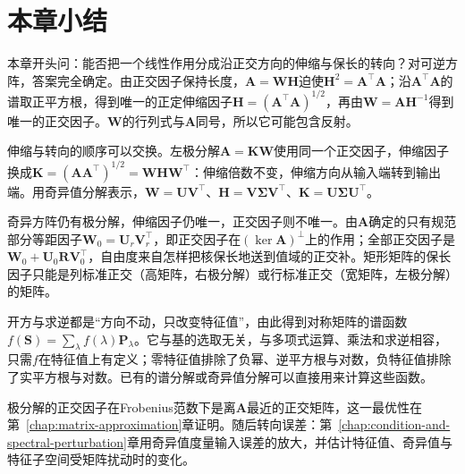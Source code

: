 \FloatBarrier
\section{本章小结}
\label{sec:polar-chapter-summary}

本章开头问：能否把一个线性作用分成沿正交方向的伸缩与保长的转向？对可逆方阵，答案完全确定。由正交因子保持长度，$\bm A=\bm W\bm H$迫使$\bm H^2=\bm A^\top\bm A$；沿$\bm A^\top\bm A$的谱取正平方根，得到唯一的正定伸缩因子$\bm H=(\bm A^\top\bm A)^{1/2}$，再由$\bm W=\bm A\bm H^{-1}$得到唯一的正交因子。$\bm W$的行列式与$\bm A$同号，所以它可能包含反射。

伸缩与转向的顺序可以交换。左极分解$\bm A=\bm K\bm W$使用同一个正交因子，伸缩因子换成$\bm K=(\bm A\bm A^\top)^{1/2}=\bm W\bm H\bm W^\top$：伸缩倍数不变，伸缩方向从输入端转到输出端。用奇异值分解表示，$\bm W=\bm U\bm V^\top$、$\bm H=\bm V\bm\Sigma\bm V^\top$、$\bm K=\bm U\bm\Sigma\bm U^\top$。

奇异方阵仍有极分解，伸缩因子仍唯一，正交因子则不唯一。由$\bm A$确定的只有规范部分等距因子$\bm W_0=\bm U_r\bm V_r^\top$，即正交因子在$(\ker\bm A)^\perp$上的作用；全部正交因子是$\bm W_0+\bm U_0\bm R\bm V_0^\top$，自由度来自怎样把核保长地送到值域的正交补。矩形矩阵的保长因子只能是列标准正交（高矩阵，右极分解）或行标准正交（宽矩阵，左极分解）的矩阵。

开方与求逆都是“方向不动，只改变特征值”，由此得到对称矩阵的谱函数$f(\bm S)=\sum_\lambda f(\lambda)\bm P_\lambda$。它与基的选取无关，与多项式运算、乘法和求逆相容，只需$f$在特征值上有定义；零特征值排除了负幂、逆平方根与对数，负特征值排除了实平方根与对数。已有的谱分解或奇异值分解可以直接用来计算这些函数。

极分解的正交因子在Frobenius范数下是离$\bm A$最近的正交矩阵，这一最优性在第~\ref{chap:matrix-approximation}章证明。随后转向误差：第~\ref{chap:condition-and-spectral-perturbation}章用奇异值度量输入误差的放大，并估计特征值、奇异值与特征子空间受矩阵扰动时的变化。
